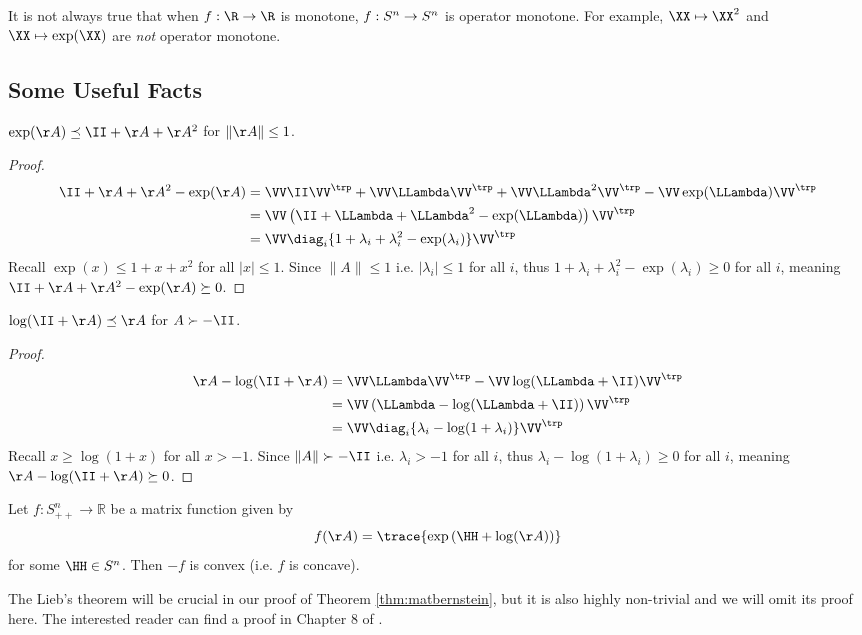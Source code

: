 \begin{remark}
  It is not always true that when $f: \R \to \R$ is monotone, $f:
  S^n \to S^n$ is operator monotone.
  For example, $\XX \mapsto \XX^2$ and $\XX \mapsto \exp(\XX)$ are \emph{not}
  operator monotone.
\end{remark}

\subsection{Some Useful Facts}
\begin{lemma}\label{lem:ineq_exp}
  $\exp(\AA) \preceq \II + \AA + \AA^2$ for $\|\AA\|\leq1$.
\end{lemma}
\begin{proof}
  \begin{align*}
    \II+\AA+\AA^2-\exp(\AA)
    &= \VV\II\VV^\trp + \VV\LLambda\VV^\trp + \VV\LLambda^2\VV^\trp - \VV\exp(\LLambda)\VV^\trp \\
    &= \VV\left(\II+\LLambda+\LLambda^2-\exp(\LLambda)\right)\VV^\trp \\
    &= \VV \diag_i\{1+\lambda_i+\lambda_i^2-\exp(\lambda_i)\} \VV^\trp
  \end{align*}
  Recall $\exp(x)\leq1+x+x^2$ for all $|x|\leq1$.
  Since $\|A\|\leq1$ i.e. $|\lambda_i|\leq1$ for all $i$, thus $1+\lambda_i+\lambda_i^2-\exp(\lambda_i)\geq0$ for all $i$,
  meaning $\II+\AA+\AA^2-\exp(\AA) \succeq 0$.
\end{proof}

\begin{lemma}\label{lem:ineq_log}
  $\log(\II+\AA) \preceq \AA$ for $A\succ-\II$.
\end{lemma}
\begin{proof}
  \begin{align*}
    \AA-\log(\II+\AA)
    &= \VV\LLambda\VV^\trp - \VV\log(\LLambda+\II)\VV^\trp \\
    &= \VV\left(\LLambda-\log(\LLambda+\II)\right)\VV^\trp \\
    &= \VV \diag_i\{\lambda_i-\log(1+\lambda_i)\} \VV^\trp
  \end{align*}
  Recall $x\geq\log(1+x)$ for all $x>-1$.
  Since $\|A\|\succ-\II$ i.e. $\lambda_i>-1$ for all $i$, thus $\lambda_i-\log(1+\lambda_i)\geq0$ for all $i$,
  meaning $\AA-\log(\II+\AA) \succeq 0$.
\end{proof}

\begin{theorem}[Lieb]
  \label{thm:Lieb}
  Let $f:S^n_{++}\to\mathbb{R}$ be a matrix function given by
  \[ f(\AA) = \trace{\exp\left(\HH+\log(\AA)\right)} \]
  for some $\HH\in S^n$. Then $-f$ is convex (i.e. $f$ is concave).
\end{theorem}
The Lieb's theorem will be crucial in our proof of Theorem \ref{thm:matbernstein},
but it is also highly non-trivial and we will omit its proof here.
The interested reader can find a proof in Chapter 8 of \cite{tropp15}.

